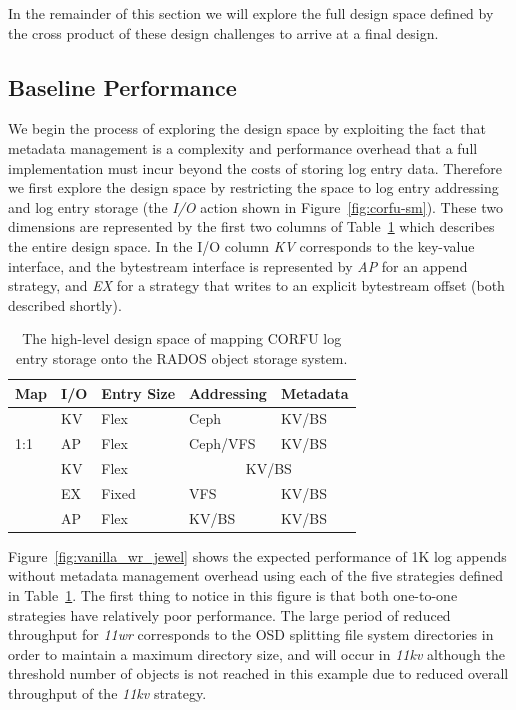 \documentclass[10pt,twocolumn]{article}
\begin{document}
In the remainder of this section we will explore the full design space defined
by the cross product of these design challenges to arrive at a final design.

\subsection{Baseline Performance}

We begin the process of exploring the design space by exploiting the fact that
metadata management is a complexity and performance overhead that a full
implementation must incur beyond the costs of storing log entry data.
Therefore we first explore the design space by restricting the
space to log entry addressing and log entry storage (the \emph{I/O} action
shown in Figure~\ref{fig:corfu-sm}).  These two dimensions are
represented by the first two columns of Table~\ref{tab:pd-map} which describes
the entire design space. In the I/O column \emph{KV} corresponds to the
key-value interface, and the bytestream interface is represented by \emph{AP}
for an append strategy, and \emph{EX} for a strategy that writes to an
explicit bytestream offset (both described shortly).

\begin{table}[h]
\begin{tabular}{ | l | l | l | l | l |}
\hline
Map & I/O & Entry Size & Addressing & Metadata \\ \hline
\multirow{3}{*}{1:1} & KV  & Flex     & Ceph      & KV/BS \\ \cline{2-5}
                     & AP  & Flex     & Ceph/VFS  & KV/BS \\ \hline
\multirow{4}{*}{N:1} & KV  & Flex     & \multicolumn{2}{|c|}{KV/BS} \\ \cline{2-5}
                     & EX  & Fixed    & VFS       & KV/BS \\ \cline{2-5}
                     & AP  & Flex     & KV/BS     & KV/BS \\
\hline
\end{tabular}
\caption{The high-level design space of mapping CORFU log entry storage onto
the RADOS object storage system.}
\label{tab:pd-map}
\end{table}

Figure~\ref{fig:vanilla_wr_jewel} shows the expected performance of 1K log
appends without metadata management overhead using each of the five strategies
defined in Table~\ref{tab:pd-map}. The first thing to notice in this figure is
that both one-to-one strategies have relatively poor performance. The large
period of reduced throughput for \emph{11wr} corresponds to the OSD splitting
file system directories in order to maintain a maximum directory size, and
will occur in \emph{11kv} although the threshold number of objects is not
reached in this example due to reduced overall throughput of the \emph{11kv}
strategy.
\end{document}
